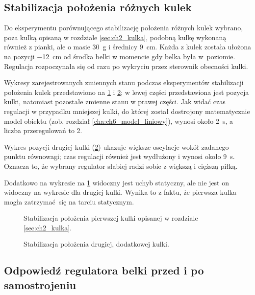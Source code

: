 \subsection{Stabilizacja położenia różnych kulek}
\label{subsec:ch9_stabilizacja_polozenia_roznych_kulek}

Do eksperymentu porównującego stabilizację położenia różnych kulek wybrano, poza kulką opisaną w rozdziale \ref{sec:ch2_kulka}, podobną kulkę wykonaną również z pianki, ale o masie \SI{30}{\gram} i średnicy \SI{9}{\centi\meter}. Każda z kulek została ułożona na pozycji \SI{-12}{\centi\meter} od środka belki w momencie gdy belka była w~poziomie. Regulacja rozpoczynała się od razu po wykryciu przez sterownik obecności kulki.

Wykresy zarejestrowanych zmiennych stanu podczas eksperymentów stabilizacji położenia kulek przedstawiono na \cref{fig:stabilizacja_kulka1} i \cref{fig:stabilizacja_kulka2}; w lewej części przedstawiona jest pozycja kulki, natomiast pozostałe zmienne stanu w prawej części. Jak widać czas regulacji w przypadku mniejszej kulki, do której został dostrojony matematycznie model obiektu (zob. rozdział \ref{cha:ch6_model_liniowy}), wynosi około \SI{2}{\second}, a liczba przeregulowań to 2.

Wykres pozycji drugiej kulki (\cref{fig:stabilizacja_kulka2}) ukazuje większe oscylacje wokół zadanego punktu równowagi; czas regulacji również jest wydłużony i wynosi około \SI{9}{\second}. Oznacza to, że wybrany regulator słabiej radzi sobie z większą i cięższą piłką.

Dodatkowo na wykresie na \cref{fig:stabilizacja_kulka1} widoczny jest uchyb statyczny, ale nie jest on widoczny na wykresie dla drugiej kulki. Wynika to z faktu, że pierwsza kulka mogła zatrzymać się na tarciu statycznym.

\begin{figure}[p]
    
    \caption{Stabilizacja położenia pierwszej kulki opisanej w rozdziale \ref{sec:ch2_kulka}.}
    \label{fig:stabilizacja_kulka1}
\end{figure}
\begin{figure}[p]
    
    \caption{Stabilizacja położenia drugiej, dodatkowej kulki.}
    \label{fig:stabilizacja_kulka2}
\end{figure}

\subsection{Odpowiedź regulatora belki przed i po samostrojeniu}
\label{subsec:ch9_odp_regulatora_belki}

